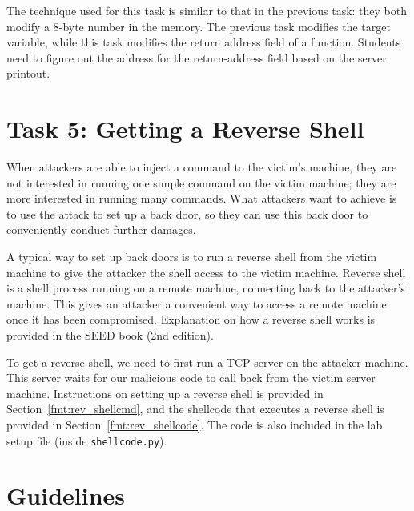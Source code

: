 The technique used for this task is similar to that in the previous task:
they both modify a 8-byte number in the memory. The previous task
modifies the target variable, while this task modifies the return 
address field of a function. Students need to figure out the address 
for the return-address field based on the server printout. 




\section{Task 5: Getting a Reverse Shell} 

When attackers are able to inject a command to the victim's machine,
they are not interested in running one simple
command on the victim machine; they are more interested in running many
commands. What attackers want to achieve is to use the
attack to set up a back door, so they can use this
back door to conveniently conduct further damages.

A typical way to set up back doors is to run a reverse shell from the
victim machine to give the attacker the shell access to the victim machine.
Reverse shell is a shell process running on a remote machine, connecting
back to the attacker's machine. This gives an attacker a convenient way to
access a remote machine once it has been compromised. Explanation on how a
reverse shell works is provided in the SEED book (2nd edition).

To get a reverse shell, we need to first run a TCP server on the attacker
machine. This server waits for our malicious code to call back from the
victim server machine. Instructions on setting up
a reverse shell is provided in Section~\ref{fmt:rev_shellcmd}, and 
the shellcode that executes a reverse shell is 
provided in Section~\ref{fmt:rev_shellcode}. The code is also included 
in the lab setup file (inside \texttt{shellcode.py}). 





\section{Guidelines}


